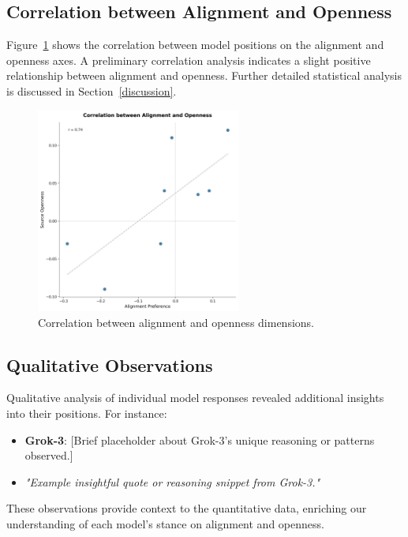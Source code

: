 \subsection{Correlation between Alignment and Openness}

Figure~\ref{fig:correlation} shows the correlation between model positions on the alignment and openness axes. A preliminary correlation analysis indicates a slight positive relationship between alignment and openness. Further detailed statistical analysis is discussed in Section~\ref{discussion}.

\begin{figure}[htbp]
    \centering
    \includegraphics[width=0.6\textwidth]{figures/alignment_openness_correlation.png}
    \caption{Correlation between alignment and openness dimensions.}
    \label{fig:correlation}
\end{figure}

\subsection{Qualitative Observations}

Qualitative analysis of individual model responses revealed additional insights into their positions. For instance:

\begin{itemize}
    \item \textbf{Grok-3}: [Brief placeholder about Grok-3's unique reasoning or patterns observed.]
    \item \textit{"Example insightful quote or reasoning snippet from Grok-3."}
\end{itemize}

These observations provide context to the quantitative data, enriching our understanding of each model's stance on alignment and openness.